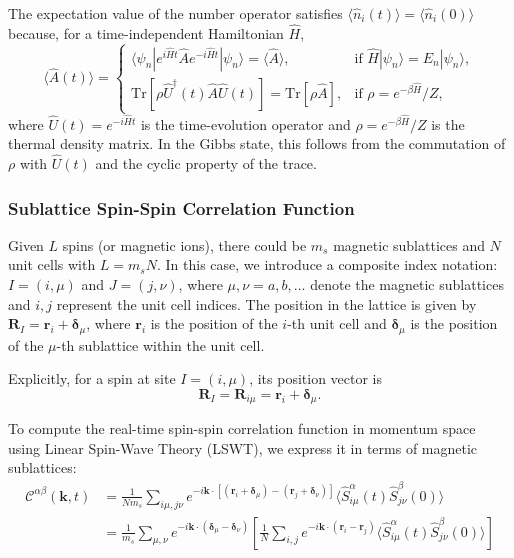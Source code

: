 The expectation value of the number operator satisfies $\langle \hat{n}_i(t) \rangle = \langle \hat{n}_i(0) \rangle$ because, for a time-independent Hamiltonian $\hat{H}$,
\begin{equation}
    \langle \hat{A}(t) \rangle = 
    \begin{cases}
        \langle \psi_n | e^{i \hat{H} t} \hat{A} e^{-i \hat{H} t} | \psi_n \rangle = \langle \hat{A} \rangle, & \text{if } \hat{H} | \psi_n \rangle = E_n | \psi_n \rangle, \\
        \mathrm{Tr} [ \rho \hat{U}^{\dagger}(t) \hat{A} \hat{U}(t) ] = \mathrm{Tr} [ \rho \hat{A} ], & \text{if } \rho = e^{-\beta \hat{H}} / Z,
    \end{cases}
\end{equation}
where $\hat{U}(t) = e^{-i \hat{H} t}$ is the time-evolution operator and $\rho = e^{-\beta \hat{H}} / Z$ is the thermal density matrix. In the Gibbs state, this follows from the commutation of $\rho$ with $\hat{U}(t)$ and the cyclic property of the trace.





\subsubsection{Sublattice Spin-Spin Correlation Function}

Given $L$ spins (or magnetic ions), there could be $m_{s}$ magnetic sublattices and $N$ unit cells with $L = m_{s}N$. 
In this case, we introduce a composite index notation: $I = (i, \mu)$ and $J = (j, \nu)$, where $\mu, \nu = a, b, \dots$ denote the magnetic sublattices and $i, j$ represent the unit cell indices. The position in the lattice is given by $\mathbf{R}_{I} = \mathbf{r}_{i} + \boldsymbol{\delta}_{\mu}$, where $\mathbf{r}_i$ is the position of the $i$-th unit cell and $\boldsymbol{\delta}_\mu$ is the position of the $\mu$-th sublattice within the unit cell.

Explicitly, for a spin at site $I = (i, \mu)$, its position vector is
\begin{equation}
    \mathbf{R}_{I} = \mathbf{R}_{i\mu} = \mathbf{r}_{i} + \boldsymbol{\delta}_{\mu}.
\end{equation}

To compute the real-time spin-spin correlation function in momentum space using Linear Spin-Wave Theory (LSWT), we express it in terms of magnetic sublattices:
\begin{align}
    \mathcal{C}^{\alpha\beta}(\mathbf{k}, t) 
    &= \frac{1}{Nm_{s}} \sum_{i\mu,j\nu} e^{-i\mathbf{k} \cdot [(\mathbf{r}_{i} + \boldsymbol{\delta}_{\mu}) - (\mathbf{r}_{j} + \boldsymbol{\delta}_{\nu})]} \langle \hat{S}_{i\mu}^{\alpha}(t) \hat{S}_{j\nu}^{\beta}(0) \rangle \\
    &= \frac{1}{m_{s}} \sum_{\mu,\nu} e^{-i\mathbf{k} \cdot (\boldsymbol{\delta}_{\mu} - \boldsymbol{\delta}_{\nu})} 
    \left[ 
    \frac{1}{N} \sum_{i,j} e^{-i\mathbf{k} \cdot (\mathbf{r}_{i} - \mathbf{r}_{j})} 
    \langle \hat{S}_{i\mu}^{\alpha}(t) \hat{S}_{j\nu}^{\beta}(0) \rangle \right] 
\end{align}

